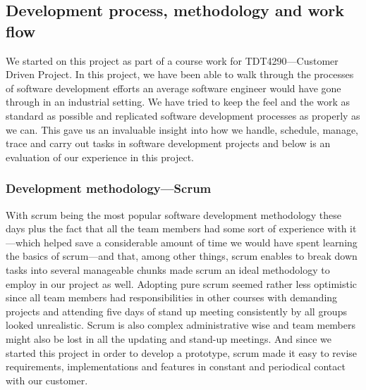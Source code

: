 \subsection{Development process, methodology and work flow}

We started on this project as part of a course work for TDT4290---Customer Driven Project. In this project, we have been able to walk through the processes of software development efforts an average software engineer would have gone through in an industrial setting. We have tried to keep the feel and the work as standard as possible and replicated software development processes as properly as we can. This gave us an invaluable insight into how we handle, schedule, manage, trace and carry out tasks in software development projects and below is an evaluation of our experience in this project.
	\subsubsection{Development methodology---Scrum}

With scrum being the most popular software development methodology these days plus the fact that all the team members had some sort of experience with it---which helped save a considerable amount of time we would have spent learning the basics of scrum---and that, among other things, scrum enables to break down tasks into several manageable chunks made scrum an ideal methodology to employ in our project as well. Adopting pure scrum seemed rather less optimistic since all team members had responsibilities in other courses with demanding projects and attending five days of stand up meeting consistently by all groups looked unrealistic. Scrum is also complex administrative wise and team members might also be lost in all the updating and stand-up meetings. And since we started this project in order to develop a prototype, scrum made it easy to revise requirements, implementations and features in constant and periodical contact with our customer. 

